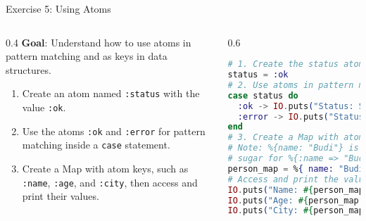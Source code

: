\documentclass[aspectratio=169, table]{beamer}
\begin{document}
\begin{frame}[fragile]{Exercise 5: Using Atoms}
\vspace{20pt}
\begin{columns}
    \begin{column}[T]{0.4\textwidth}
        \textbf{Goal}: Understand how to use atoms in pattern matching and as keys in data structures.
        \begin{enumerate}
            \item Create an atom named \texttt{:status} with the value \texttt{:ok}.
            \item Use the atoms \texttt{:ok} and \texttt{:error} for pattern matching inside a \texttt{case} statement.
            \item Create a Map with atom keys, such as \texttt{:name}, \texttt{:age}, and \texttt{:city}, then access and print their values.
        \end{enumerate}

    \end{column}

    \begin{column}[T]{0.6\textwidth}
        \begin{lstlisting}[language=Elixir, basicstyle=\ttfamily\footnotesize]
# 1. Create the status atom
status = :ok
# 2. Use atoms in pattern matching
case status do
  :ok -> IO.puts("Status: Success")
  :error -> IO.puts("Status: Failure")
end
# 3. Create a Map with atom keys
# Note: %{name: "Budi"} is syntax
# sugar for %{:name => "Budi"}
person_map = %{ name: "Budi", age: 25, city: "Jakarta" }
# Access and print the values
IO.puts("Name: #{person_map[:name]}")
IO.puts("Age: #{person_map[:age]}")
IO.puts("City: #{person_map[:city]}")
        \end{lstlisting}
    \end{column}
\end{columns}
\end{frame}
\end{document}
